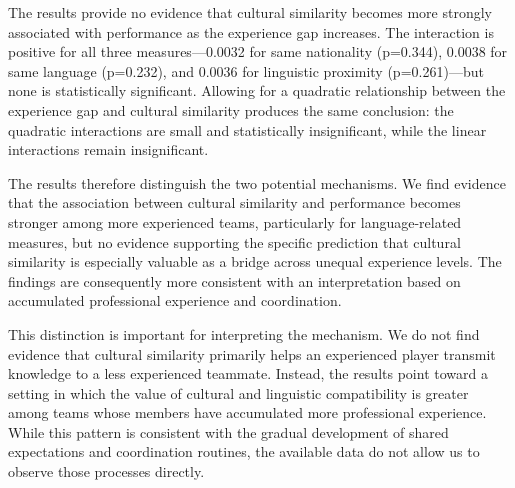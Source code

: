 \documentclass[10pt]{article}
\begin{document}
The results provide no evidence that cultural similarity becomes more strongly associated with performance as the experience gap increases. The interaction is positive for all three measures—0.0032 for same nationality (p=0.344), 0.0038 for same language (p=0.232), and 0.0036 for linguistic proximity (p=0.261)—but none is statistically significant. Allowing for a quadratic relationship between the experience gap and cultural similarity produces the same conclusion: the quadratic interactions are small and statistically insignificant, while the linear interactions remain insignificant.

The results therefore distinguish the two potential mechanisms. We find evidence that the association between cultural similarity and performance becomes stronger among more experienced teams, particularly for language-related measures, but no evidence supporting the specific prediction that cultural similarity is especially valuable as a bridge across unequal experience levels. The findings are consequently more consistent with an interpretation based on accumulated professional experience and coordination.

This distinction is important for interpreting the mechanism. We do not find evidence that cultural similarity primarily helps an experienced player transmit knowledge to a less experienced teammate. Instead, the results point toward a setting in which the value of cultural and linguistic compatibility is greater among teams whose members have accumulated more professional experience. While this pattern is consistent with the gradual development of shared expectations and coordination routines, the available data do not allow us to observe those processes directly.
\end{document}
